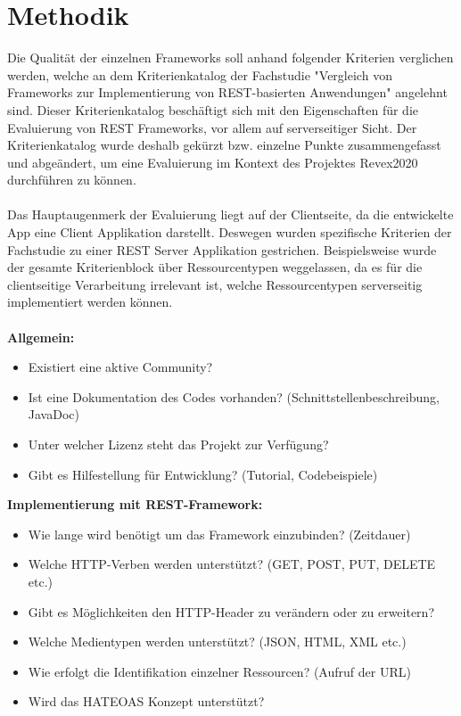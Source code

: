 \section{Methodik}
\label{sec:methodik}
Die Qualität der einzelnen Frameworks soll anhand folgender Kriterien verglichen werden, welche an dem Kriterienkatalog der Fachstudie "Vergleich von Frameworks zur Implementierung von REST-basierten Anwendungen" \cite{vergleich13} angelehnt sind. Dieser Kriterienkatalog beschäftigt sich mit den Eigenschaften für die Evaluierung von REST Frameworks, vor allem auf serverseitiger Sicht. Der Kriterienkatalog wurde deshalb gekürzt bzw. einzelne Punkte zusammengefasst und abgeändert, um eine Evaluierung im Kontext des Projektes Revex2020 durchführen zu können. 
\\\\
Das Hauptaugenmerk der Evaluierung liegt auf der Clientseite, da die entwickelte App eine Client Applikation darstellt. Deswegen wurden spezifische Kriterien der Fachstudie zu einer REST Server Applikation gestrichen. Beispielsweise wurde der gesamte Kriterienblock über Ressourcentypen \cite{ressourcen:rest} weggelassen, da es für die clientseitige Verarbeitung irrelevant ist, welche Ressourcentypen serverseitig implementiert werden können. 
\\\\
\textbf{Allgemein:}
\begin{itemize}
	\item Existiert eine aktive Community?
	\item Ist eine Dokumentation des Codes vorhanden? (Schnittstellenbeschreibung, JavaDoc)
	\item Unter welcher Lizenz steht das Projekt zur Verfügung?
	\item Gibt es Hilfestellung für Entwicklung? (Tutorial, Codebeispiele)
\end{itemize}

\textbf{Implementierung mit REST-Framework:}
\begin{itemize}
	\item Wie lange wird benötigt um das Framework einzubinden?  (Zeitdauer)
	\item Welche \acrfull{HTTP}-Verben werden unterstützt? (GET, POST, PUT, DELETE etc.)
	\item Gibt es Möglichkeiten den HTTP-Header zu verändern oder zu erweitern?
	\item Welche Medientypen werden unterstützt? (JSON, HTML, XML etc.)
	\item Wie erfolgt die Identifikation einzelner Ressourcen? (Aufruf der URL)
	\item Wird das HATEOAS Konzept unterstützt?
\end{itemize}


